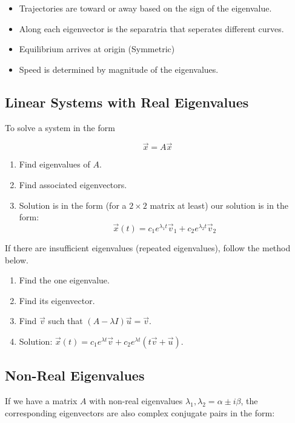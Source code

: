             \begin{itemize}
                \item Trajectories are toward or away based on the sign of the eigenvalue.
                \item Along each eigenvector is the separatria that seperates different curves.
                \item Equilibrium arrives at origin (Symmetric)
                \item Speed is determined by magnitude of the eigenvalues.
            \end{itemize}

    \subsection{Linear Systems with Real Eigenvalues}
    To solve a system in the form

        \[
            \vec{x} = A \vec{x}
        \]

        \begin{enumerate}
            \item Find eigenvalues of $A$.
            \item Find associated eigenvectors.
            \item Solution is in the form (for a $2\times 2$ matrix at least) our solution is in the form:
                \[
                    \vec{x}(t) = c_1 e^{\lambda_1 t} \vec{v}_1 + c_2 e^{\lambda_2 t} \vec{v}_2
                \]
        \end{enumerate}

    If there are insufficient eigenvalues (repeated eigenvalues), follow the method below.

        \begin{enumerate}
            \item Find the one eigenvalue.
            \item Find its eigenvector.
            \item Find $\vec{v}$ such that $(A - \lambda I) \vec{u} = \vec{v}$.
            \item Solution: $\vec{x}(t) = c_1 e^{\lambda t} \vec{v} + c_2 e^{\lambda t} (t \vec{v} + \vec{u})$.
        \end{enumerate}

    \subsection{Non-Real Eigenvalues}
    If we have a matrix $A$ with non-real eigenvalues $\lambda_1, \lambda_2 = \alpha \pm i \beta$, the corresponding eigenvectors are also complex conjugate pairs in the form:

